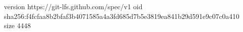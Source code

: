 version https://git-lfs.github.com/spec/v1
oid sha256:f4fcfaa8b2bfaf3b4071585a4a3fd685d7b5e3819ea841b29d591e9c07c0a410
size 4448
